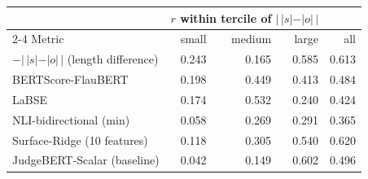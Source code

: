 \begin{tabular}{lrrrr}
\toprule
& \multicolumn{3}{c}{$r$ within tercile of $|\,|s|-|o|\,|$} & \\
\cmidrule(lr){2-4}
Metric & small & medium & large & all \\
\midrule
$-|\,|s|-|o|\,|$ (length difference) & 0.243 & 0.165 & 0.585 & 0.613 \\
BERTScore-FlauBERT & 0.198 & 0.449 & 0.413 & 0.484 \\
LaBSE & 0.174 & 0.532 & 0.240 & 0.424 \\
NLI-bidirectional (min) & 0.058 & 0.269 & 0.291 & 0.365 \\
Surface-Ridge (10 features) & 0.118 & 0.305 & 0.540 & 0.620 \\
JudgeBERT-Scalar (baseline) & 0.042 & 0.149 & 0.602 & 0.496 \\
\bottomrule
\end{tabular}